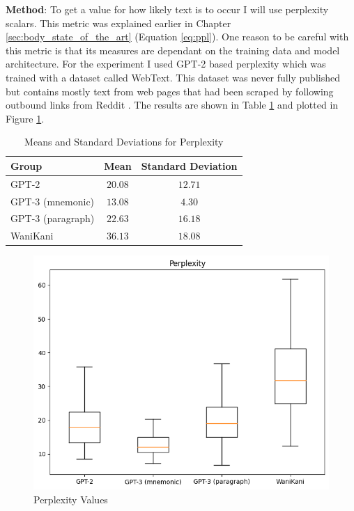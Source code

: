 \textbf{Method}: To get a value for how likely text is to occur I will use perplexity scalars. This metric was explained earlier in Chapter \ref{sec:body_state_of_the_art} (Equation \ref{eq:ppl}). One reason to be careful with this metric is that its measures are dependant on the training data and model architecture. For the experiment I used GPT-2 based perplexity which was trained with a dataset called WebText. This dataset was never fully published but contains mostly text from web pages that had been scraped by following outbound links from Reddit \cite{gpt2_hugging_face}. The results are shown in Table \ref{tab:ppl_whole_mnemonic} and plotted in Figure \ref{figure:ppl_whole_mnemonic}.     
\begin{table}[ht] 
\centering
\caption{Means and Standard Deviations for Perplexity}
\label{table:group_stats}
\begin{tabular}{lcc}
\toprule
Group & Mean & Standard Deviation \\
\midrule
GPT-2& $20.08$ & $12.71$ \\
GPT-3 (mnemonic) & $13.08$ & $4.30$ \\
GPT-3 (paragraph)& $22.63$ & $16.18$ \\
WaniKani & $36.13$ & $18.08$ \\
\bottomrule
\end{tabular}
\label{tab:ppl_whole_mnemonic}
\end{table}
\begin{figure}
    \centering
    \includegraphics[width=400pt]{resources/ppl_entire_mnemonic.png}
    \caption{Perplexity Values}
    \label{figure:ppl_whole_mnemonic}
\end{figure}


